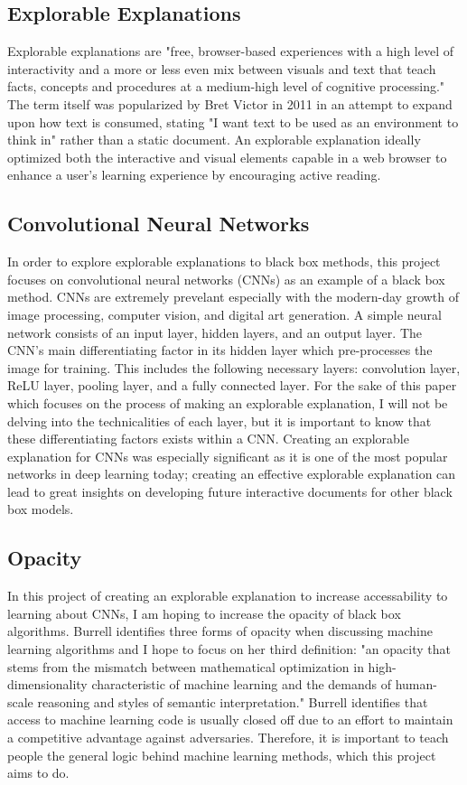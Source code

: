\documentclass[10pt,twocolumn]{article}
\begin{document}
\subsection{Explorable Explanations}
Explorable explanations are "free, browser-based experiences with a high level of interactivity and a more or less even mix between visuals and text that teach facts, concepts and procedures at a medium-high level of
cognitive processing." \cite{ExplorableExplanation} The term itself was popularized by Bret Victor in 2011 in an attempt to expand upon how text is consumed, stating "I want text to be used as an environment to think in" rather than a static document. \cite{VictorB} An explorable explanation ideally optimized both the interactive and visual elements capable in a web browser to enhance a user's learning experience by encouraging active reading. 

\subsection{Convolutional Neural Networks}
In order to explore explorable explanations to black box methods, this project focuses on convolutional neural networks (CNNs) as an example of a black box method. CNNs are extremely prevelant especially with the modern-day growth of image processing, computer vision, and digital art generation. A simple neural network consists of an input layer, hidden layers, and an output layer. The CNN's main differentiating factor in its hidden layer which pre-processes the image for training. This includes the following necessary layers: convolution layer, ReLU layer, pooling layer, and a fully connected layer. For the sake of this paper which focuses on the process of making an explorable explanation, I will not be delving into the technicalities of each layer, but it is important to know that these differentiating factors exists within a CNN. Creating an explorable explanation for CNNs was especially significant as it is one of the most popular networks in deep learning today; creating an effective explorable explanation can lead to great insights on developing future interactive documents for other black box models. \cite{CNNsignificance}

\subsection{Opacity}
In this project of creating an explorable explanation to increase accessability to learning about CNNs, I am hoping to increase the opacity of black box algorithms. Burrell identifies three forms of opacity when discussing machine learning algorithms and I hope to focus on her third definition: "an opacity that stems from the mismatch between mathematical optimization in high-dimensionality characteristic of machine learning and the demands of human-scale reasoning and styles of semantic interpretation." \cite{MLOpacity} Burrell identifies that access to machine learning code is usually closed off due to an effort to maintain a competitive advantage against adversaries. Therefore, it is important to teach people the general logic behind machine learning methods, which this project aims to do. 
\end{document}
